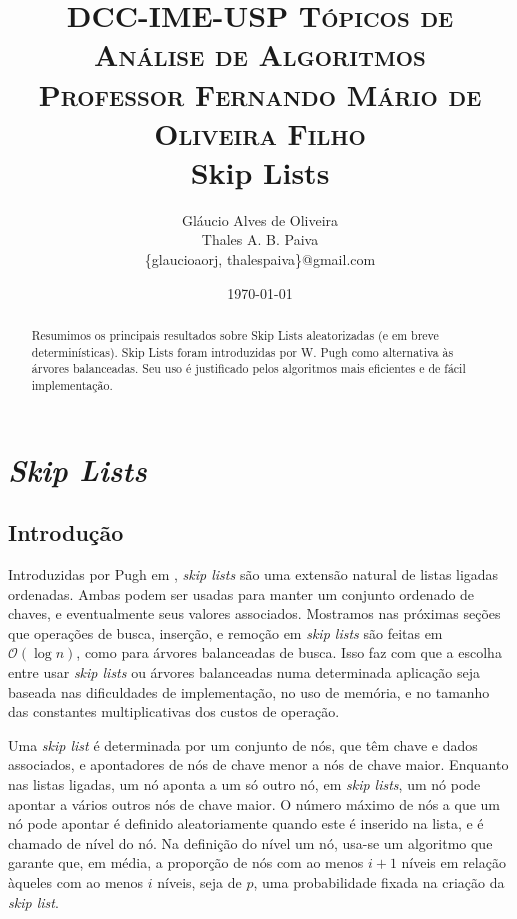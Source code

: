 \documentclass[paper=a4, fontsize=11pt]{scrartcl} %
\title{ 
\normalfont \small 
\textsc{DCC-IME-USP Tópicos de Análise de Algoritmos \\ Professor Fernando Mário de Oliveira Filho} \\ [25pt]
\huge Skip Lists%
}
\author{Gláucio Alves de Oliveira \\ Thales A. B. Paiva 
        \\ \scriptsize \{glaucioaorj, thalespaiva\}@gmail.com}
\date{\normalsize\today}
\numberwithin{equation}{section}
\numberwithin{figure}{section}
\numberwithin{table}{section}
\numberwithin{definition}{section}
\numberwithin{theorem}{section}
\numberwithin{property}{section}
\numberwithin{proposition}{section}
\newcommand{\horrule}[1]{\rule{\linewidth}{#1}} %
\newcommand{\cO}{\ensuremath{\mathcal{O}}}
\newcommand{\SLs}{\textit{Skip Lists}\xspace}
\newcommand{\sls}{\textit{skip lists}\xspace}
\renewcommand{\sl}{\textit{skip list}\xspace}
\begin{document}
\maketitle %

\begin{abstract} \noindent

Resumimos os principais resultados sobre Skip Lists aleatorizadas (e em breve determinísticas). 
Skip Lists foram introduzidas por W. Pugh como alternativa às árvores balanceadas. 
Seu uso é justificado pelos algoritmos mais eficientes e de fácil implementação.

\end{abstract}

\tableofcontents

\pagebreak
\section{\SLs}
\FloatBarrier

\subsection{Introdução}

Introduzidas por Pugh em \cite{pugh}, \sls são uma extensão natural de listas ligadas ordenadas. 
Ambas podem ser usadas para manter um conjunto ordenado de chaves, e eventualmente seus valores associados.
Mostramos nas próximas seções que operações de busca, inserção, e remoção em \sls são feitas em $\cO(\log n)$, 
como para árvores balanceadas de busca. Isso faz com que a escolha entre usar \sls ou árvores balanceadas numa
determinada aplicação seja baseada nas dificuldades de implementação, no uso de memória, e no tamanho das 
constantes multiplicativas dos custos de operação. 

Uma \sl é determinada por um conjunto de nós, que têm chave e dados associados, e apontadores de nós de chave 
menor a nós de chave maior.
Enquanto nas listas ligadas, um nó aponta a um só outro nó, em \sls, um nó pode apontar a vários 
outros nós de chave maior. 
O número máximo de nós a que um nó pode apontar é definido aleatoriamente quando este é inserido na lista, e 
é chamado de nível do nó. Na definição do nível um nó, usa-se um algoritmo que garante que, em média, a proporção 
de nós com ao menos $i + 1$ níveis em relação àqueles com ao menos $i$ níveis, seja de $p$, uma probabilidade
fixada na criação da \sl.
\end{document}
